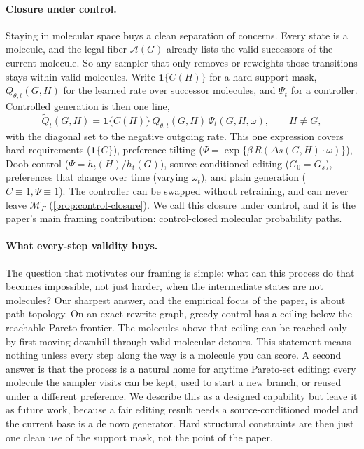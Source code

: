 \documentclass{article}
\newcommand{\M}{\mathcal{M}_{\Gamma}}
\newcommand{\A}{\mathcal{A}}
\newcommand{\one}{\mathbf{1}}
\theoremstyle{definition}
\theoremstyle{remark}
\begin{document}
\paragraph{Closure under control.}
Staying in molecular space buys a clean separation of concerns. Every state is a molecule, and the legal fiber $\A(G)$ already lists the valid successors of the current molecule. So any sampler that only removes or reweights those transitions stays within valid molecules. Write $\one\{C(H)\}$ for a hard support mask, $Q_{\theta,t}(G,H)$ for the learned rate over successor molecules, and $\Psi_t$ for a controller. Controlled generation is then one line,
\begin{equation}
\widetilde Q_t(G,H)=\one\{C(H)\}\,Q_{\theta,t}(G,H)\,\Psi_t(G,H,\omega),\qquad H\neq G,
\label{eq:control-law}
\end{equation}
with the diagonal set to the negative outgoing rate. This one expression covers hard requirements ($\one\{C\}$), preference tilting ($\Psi=\exp\{\beta\,R(\Delta s(G,H)\cdot\omega)\}$), Doob control ($\Psi=h_t(H)/h_t(G)$), source-conditioned editing ($G_0=G_s$), preferences that change over time (varying $\omega_t$), and plain generation ($C\equiv1,\Psi\equiv1$). The controller can be swapped without retraining, and can never leave $\M$ (\cref{prop:control-closure}). We call this closure under control, and it is the paper's main framing contribution: control-closed molecular probability paths.

\paragraph{What every-step validity buys.}
The question that motivates our framing is simple: what can this process do that becomes impossible, not just harder, when the intermediate states are not molecules? Our sharpest answer, and the empirical focus of the paper, is about path topology. On an exact rewrite graph, greedy control has a ceiling below the reachable Pareto frontier. The molecules above that ceiling can be reached only by first moving downhill through valid molecular detours. This statement means nothing unless every step along the way is a molecule you can score. A second answer is that the process is a natural home for anytime Pareto-set editing: every molecule the sampler visits can be kept, used to start a new branch, or reused under a different preference. We describe this as a designed capability but leave it as future work, because a fair editing result needs a source-conditioned model and the current base is a de novo generator. Hard structural constraints are then just one clean use of the support mask, not the point of the paper.
\end{document}

